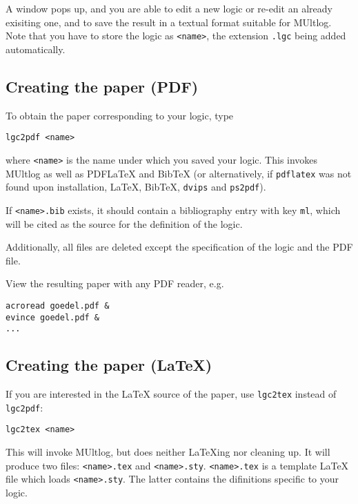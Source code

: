 \documentclass[]{article}
\begin{document}
A window pops up, and you are able to edit a new logic or re-edit an
already exisiting one, and to save the result in a textual format
suitable for MUltlog. Note that you have to store the logic as
\texttt{\textless{}name\textgreater{}}, the extension \texttt{.lgc}
being added automatically.

\hypertarget{creating-the-paper-pdf}{%
\subsection{Creating the paper (PDF)}\label{creating-the-paper-pdf}}

To obtain the paper corresponding to your logic, type

\begin{verbatim}
lgc2pdf <name>
\end{verbatim}

where \texttt{\textless{}name\textgreater{}} is the name under which you
saved your logic. This invokes MUltlog as well as PDFLaTeX and BibTeX
(or alternatively, if \texttt{pdflatex} was not found upon installation,
LaTeX, BibTeX, \texttt{dvips} and \texttt{ps2pdf}).

If \texttt{\textless{}name\textgreater{}.bib} exists, it should contain
a bibliography entry with key \texttt{ml}, which will be cited as the
source for the definition of the logic.

Additionally, all files are deleted except the specification of the
logic and the PDF file.

View the resulting paper with any PDF reader, e.g.

\begin{verbatim}
acroread goedel.pdf &
evince goedel.pdf &
...
\end{verbatim}

\hypertarget{creating-the-paper-latex}{%
\subsection{Creating the paper (LaTeX)}\label{creating-the-paper-latex}}

If you are interested in the LaTeX source of the paper, use
\texttt{lgc2tex} instead of \texttt{lgc2pdf}:

\begin{verbatim}
lgc2tex <name>
\end{verbatim}

This will invoke MUltlog, but does neither LaTeXing nor cleaning up. It
will produce two files: \texttt{\textless{}name\textgreater{}.tex} and
\texttt{\textless{}name\textgreater{}.sty}.
\texttt{\textless{}name\textgreater{}.tex} is a template LaTeX file
which loads \texttt{\textless{}name\textgreater{}.sty}. The latter
contains the difinitions specific to your logic.
\end{document}
